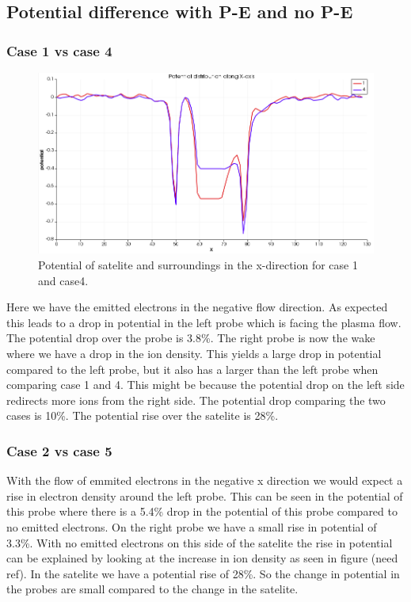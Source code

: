 \subsection{Potential difference with P-E and no P-E}

\subsubsection{Case 1 vs case 4}

\begin{figure}
    \includegraphics[width = 0.3 \textwidth]{images/pot_case14.png}
    \caption{Potential of satelite and surroundings in the x-direction for case 1 and case4.}
\end{figure}


Here we have the emitted electrons in the negative flow direction. As expected this
leads to a drop in potential in the left probe which is facing the plasma flow. The
potential drop over the probe is 3.8\%. The right probe is now the wake where we have
a drop in the ion density. This yields a large drop in potential compared to the left
probe, but it also has a larger than the left probe when comparing case 1 and 4. This
might be because the potential drop on the left side redirects more ions from the right side.
The potential drop comparing the two cases is 10\%. The potential rise over the satelite is 28\%.


\subsubsection{Case 2 vs case 5}


With the flow of emmited electrons in the negative x direction we would expect a rise in electron density around the left probe. This can be seen in the potential of this probe where there is a 5.4\% drop in the potential of this probe compared to no emitted electrons. On the right probe we have a small rise in potential of 3.3\%. With no emitted electrons on this side of the satelite the rise in potential can be explained by looking at the increase in ion density as seen in figure (need ref). In the satelite we have a potential rise of 28\%. So the change in potential in the probes are small compared to the change in the satelite.

